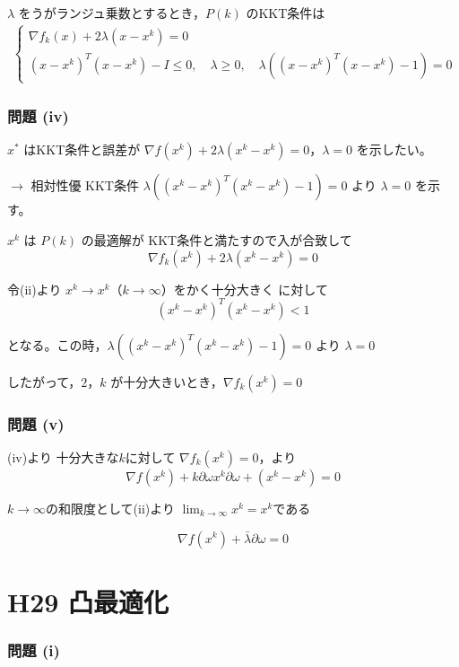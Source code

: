 \documentclass[12pt,a4paper]{article}
\begin{document}
$\lambda$ をうがランジュ乗数とするとき，$P(k)$ のKKT条件は
\begin{align}
\begin{cases}
\nabla f_k(x) + 2\lambda(x - x^k) = 0 \\
(x - x^k)^T(x - x^k) - I \leq 0, \quad \lambda \geq 0, \quad \lambda((x - x^k)^T(x - x^k) - 1) = 0
\end{cases}
\tag{★}
\end{align}

\section*{問題 (iv)}

$x^*$ はKKT条件と誤差が $\nabla f(x^k) + 2\lambda(x^k - x^k) = 0$，$\lambda = 0$ を示したい。

$\rightarrow$ 相対性優 KKT条件 $\lambda((x^k - x^k)^T(x^k - x^k) - 1) = 0$ より $\lambda = 0$ を示す。

$x^k$ は $P(k)$ の最適解が KKT条件と満たすので入が合致して
\[\nabla f_k(x^k) + 2\lambda(x^k - x^k) = 0\]

令(ii)より $x^k \to x^k$（$k \to \infty$）をかく十分大きく に対して 
\[(x^k - x^k)^T(x^k - x^k) < 1\]

となる。この時，$\lambda((x^k - x^k)^T(x^k - x^k) - 1) = 0$ より $\lambda = 0$

したがって，$2$，$k$ が十分大きいとき，$\nabla f_k(x^k) = 0$

\section*{問題 (v)}

(iv)より 十分大きな$k$に対して $\nabla f_k(x^k) = 0$，より
\[\nabla f(x^k) + k \partial \omega x^k \partial \omega + (x^k - x^k) = 0\]

$k \to \infty$の和限度として(ii)より $\lim_{k \to \infty} x^k = x^k$である

\[\nabla f(x^k) + \bar{\lambda} \partial \omega = 0\]

\newpage

\part*{H29 凸最適化}

\section*{問題 (i)}
\end{document}
